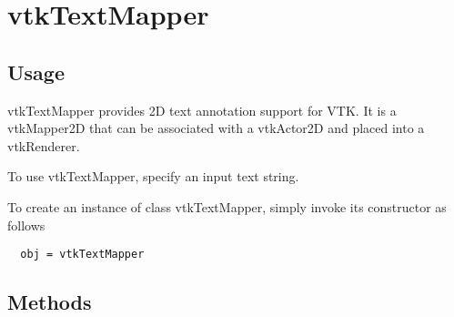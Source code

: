 \section{vtkTextMapper}

\subsection{Usage}

 vtkTextMapper provides 2D text annotation support for VTK.  It is a
 vtkMapper2D that can be associated with a vtkActor2D and placed into a
 vtkRenderer.

 To use vtkTextMapper, specify an input text string.

To create an instance of class vtkTextMapper, simply
invoke its constructor as follows
\begin{verbatim}
  obj = vtkTextMapper
\end{verbatim}
\subsection{Methods}

